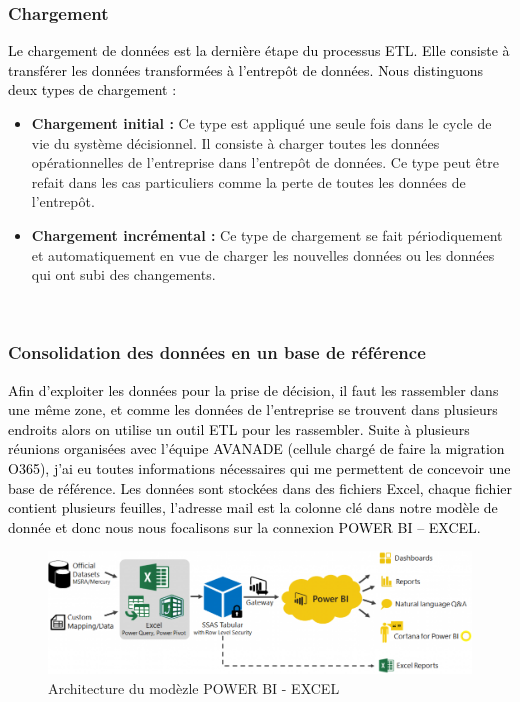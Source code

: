\subsubsection*{Chargement}

\textcolor{black}{
Le chargement de données est la dernière étape du processus ETL. Elle consiste à transférer les données transformées à l’entrepôt de données. }
\textcolor{black}{
Nous distinguons deux types de chargement :}

\begin{itemize}
	\item \textbf{Chargement initial :} Ce type est appliqué une seule fois dans le cycle de vie du système décisionnel. Il consiste à charger toutes les données opérationnelles de l’entreprise dans l’entrepôt de données. Ce type peut être refait dans les cas particuliers comme la perte de toutes les données de l’entrepôt.

    \item \textbf{Chargement incrémental :} Ce type de chargement se fait périodiquement et automatiquement en vue de charger les nouvelles données ou les données qui ont subi des changements.
\end{itemize}

~~\\

\subsubsection{Consolidation des données en un base de référence }
\textcolor{black}{Afin d’exploiter les données pour la prise de décision, il faut les rassembler dans une même zone, et comme les données de l’entreprise se trouvent dans plusieurs endroits alors on utilise un outil ETL pour les rassembler.}
\textcolor{black}{Suite à plusieurs réunions organisées avec l’équipe AVANADE (cellule chargé de faire la migration O365), j’ai eu toutes informations nécessaires qui me permettent de concevoir une base de référence.}
\textcolor{black}{Les données sont stockées dans des fichiers Excel, chaque fichier contient plusieurs feuilles, l’adresse mail est la colonne clé dans notre modèle de donnée et donc nous nous focalisons sur la connexion POWER BI – EXCEL.}


\begin{figure}[H]
	\begin{center}
		\includegraphics[width=0.8\linewidth]{Projet_O365/archi_bi_excel}
\end{center}
	\caption{Architecture du modèzle POWER BI - EXCEL}
	\label{fig:13}	
\end{figure}

